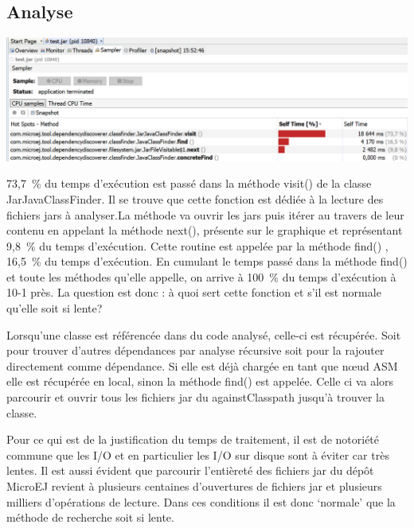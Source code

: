 \documentclass[french,a4paper,12pt]{report}
\begin{document}
\subsection{Analyse}

\begin{center}
\includegraphics[width=\textwidth]{./ressources/images/timeRepartitionByMethodssheer.png}
\end{center}

73,7 \% du temps d’exécution est passé dans la méthode visit() de la classe JarJavaClassFinder. Il se trouve que cette fonction est dédiée à la lecture des fichiers jars à analyser.La méthode va ouvrir les jars puis itérer au travers de leur contenu en appelant la méthode next(), présente sur le graphique et représentant 9,8 \% du temps d’exécution. Cette routine est appelée par la méthode find() , 16,5 \% du temps d’exécution. En cumulant le temps passé dans la méthode find() et toute les méthodes qu'elle appelle, on arrive à 100 \% du temps d’exécution à 10-1 près. La question est donc : à quoi sert cette fonction et s'il est normale qu’elle soit si lente?

Lorsqu’une classe est référencée dans du code analysé, celle-ci est récupérée. Soit pour trouver d’autres dépendances par analyse récursive soit pour la rajouter directement comme dépendance. Si elle est déjà chargée en tant que nœud ASM elle est récupérée en local, sinon la méthode find() est appelée. Celle ci va alors parcourir et ouvrir tous les fichiers jar du againstClasspath jusqu’à trouver la classe.

Pour ce qui est de la justification du temps de traitement, il est de notoriété commune que les I/O et en particulier les I/O sur disque sont à éviter car très lentes. Il est aussi évident que parcourir l’entièreté des fichiers jar du dépôt MicroEJ revient à plusieurs centaines d’ouvertures de fichiers jar et plusieurs milliers d’opérations de lecture. Dans ces conditions il est donc ‘normale’ que la méthode de recherche soit si lente.
\end{document}
